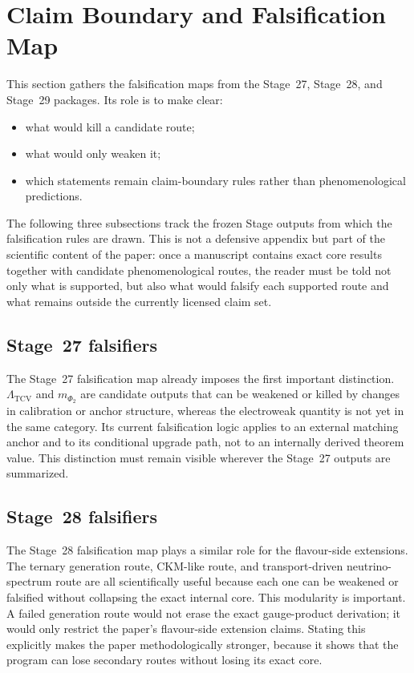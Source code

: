 \documentclass[11pt]{article}
\begin{document}
\section{Claim Boundary and Falsification Map}
This section gathers the falsification maps from the Stage~27, Stage~28, and Stage~29 packages. Its role is to make clear:
\begin{itemize}
    \item what would kill a candidate route;
    \item what would only weaken it;
    \item which statements remain claim-boundary rules rather than phenomenological predictions.
\end{itemize}
The following three subsections track the frozen Stage outputs from which the falsification rules are drawn. This is not a defensive appendix but part of the scientific content of the paper: once a manuscript contains exact core results together with candidate phenomenological routes, the reader must be told not only what is supported, but also what would falsify each supported route and what remains outside the currently licensed claim set.

\subsection{Stage~27 falsifiers}
The Stage~27 falsification map already imposes the first important distinction. $\Lambda_{\mathrm{TCV}}$ and $m_{\Phi_2}$ are candidate outputs that can be weakened or killed by changes in calibration or anchor structure, whereas the electroweak quantity is not yet in the same category. Its current falsification logic applies to an external matching anchor and to its conditional upgrade path, not to an internally derived theorem value. This distinction must remain visible wherever the Stage~27 outputs are summarized.

\subsection{Stage~28 falsifiers}
The Stage~28 falsification map plays a similar role for the flavour-side extensions. The ternary generation route, CKM-like route, and transport-driven neutrino-spectrum route are all scientifically useful because each one can be weakened or falsified without collapsing the exact internal core. This modularity is important. A failed generation route would not erase the exact gauge-product derivation; it would only restrict the paper's flavour-side extension claims. Stating this explicitly makes the paper methodologically stronger, because it shows that the program can lose secondary routes without losing its exact core.
\end{document}
